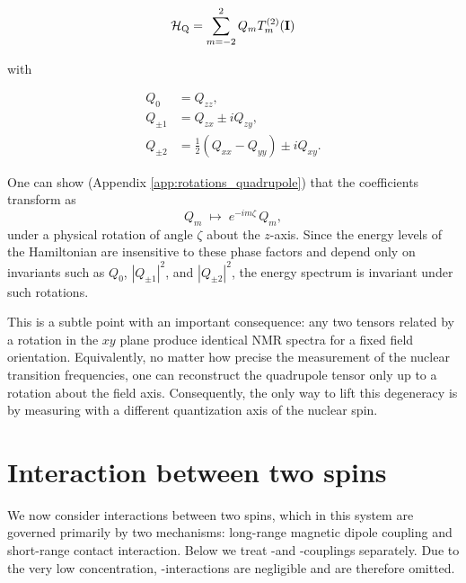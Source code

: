 \begin{equation}
    \mathcal{H}_{\text{Q}} = \sum_{m = -2}^2 Q_m T^{(2)}_m(\mathbf{I})
    \label{eq:quadrupole_spherical}
\end{equation}

\noindent with

\begin{equation}
\begin{aligned}
Q_{0} &= Q_{zz}, \\
Q_{\pm 1} &= Q_{zx} \pm i Q_{zy}, \\
Q_{\pm 2} &= \tfrac{1}{2}(Q_{xx} - Q_{yy}) \pm i Q_{xy}.
\end{aligned}
\end{equation}

One can show (Appendix \ref{app:rotations_quadrupole}) that the coefficients transform as 
\begin{equation}
Q_m \;\mapsto\; e^{-im\zeta}\, Q_m,
\end{equation}
under a physical rotation of angle $\zeta$ about the $z$-axis. Since the energy levels of the Hamiltonian are insensitive to these phase factors and depend only on invariants such as $Q_0$, $|Q_{\pm 1}|^2$, and $|Q_{\pm 2}|^2$, the energy spectrum is invariant under such rotations. 

This is a subtle point with an important consequence: any two tensors related by a rotation in the $xy$ plane produce identical NMR spectra for a fixed field orientation. Equivalently, no matter how precise the measurement of the nuclear transition frequencies, one can reconstruct the quadrupole tensor only up to a rotation about the field axis. Consequently, the only way to lift this degeneracy is by measuring with a different quantization axis of the nuclear spin.

\section{Interaction between two spins}

We now consider interactions between two spins, which in this system are governed primarily by two mechanisms: long-range magnetic dipole coupling and short-range contact interaction. Below we treat \Er-\W and \W-\W couplings separately. Due to the very low \Er concentration, \Er-\Er interactions are negligible and are therefore omitted.

